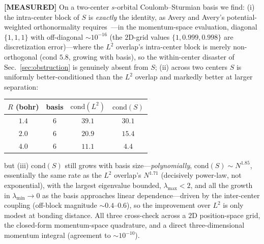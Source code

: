 \documentclass[aps,pra,twocolumn,superscriptaddress,longbibliography]{revtex4-2}
\newcommand{\gvq}[2]{#2}
\begin{document}
\textbf{[MEASURED]} On a two-center $s$-orbital Coulomb--Sturmian basis we find:
(i) the intra-center block of $S$ is \emph{exactly} the identity, as Avery and
Avery's potential-weighted orthonormality requires~\cite{avery2017}---in the
momentum-space evaluation, diagonal $\{1,1,1\}$ with off-diagonal
$\sim\!10^{-16}$ (the $2$D-grid values $\{1,0.999,0.998\}$ are discretization
error)---where the $L^2$ overlap's intra-center block is merely non-orthogonal
(cond $5.8$, growing with basis), so the within-center disaster of
Sec.~\ref{sec:obstruction} is genuinely absent from $S$; (ii) across two centers
$S$ is uniformly better-conditioned than the $L^2$ overlap and markedly better at
larger separation:
\begin{center}
\begin{tabular}{cccc}
\toprule
$R$ (bohr) & basis & $\mathrm{cond}(L^2)$ & $\mathrm{cond}(S)$ \\
\midrule
$1.4$ & $6$ & $39.1$ & $30.1$ \\
$2.0$ & $6$ & $20.9$ & $15.4$ \\
$4.0$ & $6$ & $11.1$ & $\mathbf{4.4}$ \\
\bottomrule
\end{tabular}
\end{center}
but (iii) $\mathrm{cond}(S)$ still grows with basis size---\emph{polynomially},
$\mathrm{cond}(S)\sim N^{\gvq{p60_sw_cond_exponent}{1.85}}$, essentially the same rate as the $L^2$ overlap's
$N^{\gvq{p60_l2_overlap_exponent}{1.71}}$ (decisively power-law, not exponential), with the largest eigenvalue
bounded, $\lambda_{\max}<2$, and all the growth in $\lambda_{\min}\to0$ as the
basis approaches linear dependence---driven by the inter-center coupling
(off-block magnitude $\sim0.4$--$0.6$), so the improvement over $L^2$ is only
modest at bonding distance.  All three cross-check across a $2$D position-space
grid, the closed-form momentum-space quadrature, and a direct three-dimensional
momentum integral (agreement to $\sim\!10^{-10}$).
\end{document}
